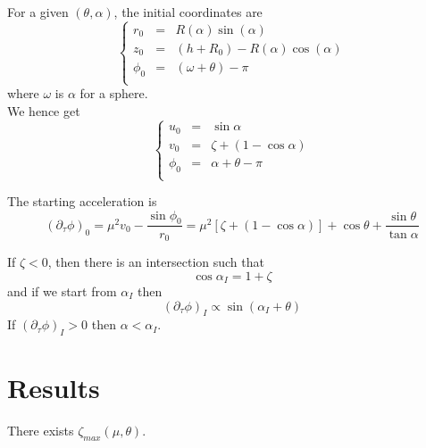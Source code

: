 \documentclass[aps,onecolumn]{revtex4}
\begin{document}
For a given $(\theta,\alpha)$, the initial coordinates are
\begin{equation}
\left\lbrace
\begin{array}{rcl}
	r_0    & = & R(\alpha) \sin(\alpha)\\
	z_0    & = & (h + R_0) - R(\alpha) \cos(\alpha)\\
	\phi_0 & = & \left(\omega + \theta\right) - \pi\\
\end{array}
\right. 
\end{equation}
where $\omega$ is $\alpha$ for a sphere.\\
We hence get
\begin{equation}
\left\lbrace
\begin{array}{rcl}
	u_0    & = & \sin\alpha\\
	v_0    & = & \zeta + (1-\cos\alpha)\\
	\phi_0 & = & \alpha+\theta-\pi\\
\end{array}
\right.
\end{equation}

The starting acceleration is
\begin{equation}
	\left(\partial_\tau \phi\right)_0 = \mu^2 v_0 - \dfrac{\sin\phi_0}{r_0} =
	\mu^2\left\lbrack \zeta + (1-\cos\alpha)\right\rbrack + \cos\theta + \dfrac{\sin\theta}{\tan\alpha}
\end{equation}

If $\zeta<0$, then there is an intersection such that
\begin{equation}
	\cos\alpha_I=1+\zeta
\end{equation}
and if we start from $\alpha_I$ then
\begin{equation}
	\left(\partial_\tau \phi\right)_I \propto \sin(\alpha_I+\theta)
\end{equation}
If $\left(\partial_\tau \phi\right)_I>0$ then $\alpha<\alpha_I$.

\section{Results}
There exists $\zeta_{max}(\mu,\theta)$.
\end{document}
